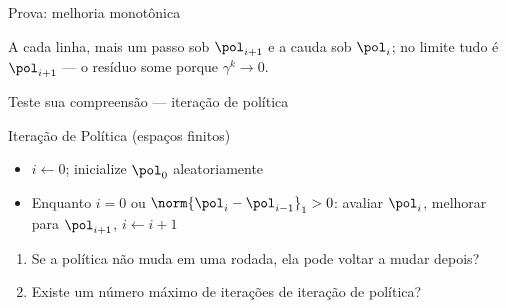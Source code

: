 \documentclass[aspectratio=169, 11pt]{beamer}
\begin{document}
\begin{frame}{Prova: melhoria monotônica}
  \begin{center}
  \end{center}
  \vspace{-0.4em}
  \begin{alertabox}
    A cada linha, mais um passo sob $\pol_{i+1}$ e a cauda sob $\pol_i$; no limite tudo
    é $\pol_{i+1}$ --- o resíduo some porque $\gamma^k \to 0$.
  \end{alertabox}
\end{frame}

\begin{frame}{Teste sua compreensão --- iteração de política}
  \begin{algbox}{Iteração de Política (espaços finitos)}
    \begin{itemize}\setlength{\itemsep}{0.2ex}
      \item $i \leftarrow 0$; inicialize $\pol_0$ aleatoriamente
      \item Enquanto $i=0$ ou $\norm{\pol_i - \pol_{i-1}}_1 > 0$: avaliar $\pol_i$,
            melhorar para $\pol_{i+1}$, $i \leftarrow i+1$
    \end{itemize}
  \end{algbox}
  \begin{quizbox}{}
    \begin{enumerate}\setlength{\itemsep}{0.3ex}
      \item Se a política \alert{não muda} em uma rodada, ela pode voltar a mudar depois?
      \item Existe um \alert{número máximo} de iterações de iteração de política?
    \end{enumerate}
  \end{quizbox}
\end{frame}
\end{document}
